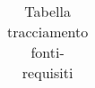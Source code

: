 \begin{table}[H]
\begin{tabular}{|p{}|p{}|}
			
			\bottomrule

		\end{tabular}
		\caption{Tabella tracciamento fonti-requisiti}
	\end{table}
	\newpage

